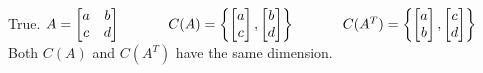 \documentclass[10pt,twoside,reqno]{article}
\begin{document}
\begin{enumerate}
\begin{center}
True. 
$
$$
A =
\begin{bmatrix}
a&b\\
c&d\\
\end{bmatrix}
\hspace{12mm}
C(A)=\left\{
\begin{bmatrix}
a\\
c\\
\end{bmatrix},
\begin{bmatrix}
b\\
d\\
\end{bmatrix}
\right\}
\hspace{12mm}
C(A^T)=\left\{
\begin{bmatrix}
a\\
b\\
\end{bmatrix},
\begin{bmatrix}
c\\
d\\
\end{bmatrix}
\right\}
$$
$ \\ \vspace{2mm}
Both $C(A)$ and $C(A^T)$ have the same dimension.
\end{center}



\end{enumerate}
\end{document}
